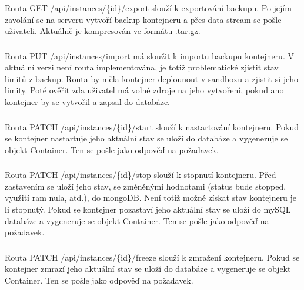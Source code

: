 \documentclass[a4paper,oneside,12pt]{report}
\begin{document}
Routa GET /api/instances/\{id\}/export slouží k exportování backupu.
Po jejím zavolání se na serveru vytvoří backup kontejneru a přes data stream se pošle uživateli.
Aktuálně je kompresován ve formátu .tar.gz.

\subsubsection{\color{apiyellow}{PUT -- /api/instances/import}}

Routa PUT /api/instances/import má sloužit k importu backupu kontejneru.
V aktuální verzi není routa implementována, je totiž problematické zjistit stav limitů z backup.
Routa by měla kontejner deplounout v sandboxu a zjistit si jeho limity.
Poté ověřit zda uživatel má volné zdroje na jeho vytvoření, pokud ano kontejner by se vytvořil a zapsal do databáze.


\subsubsection{}

Routa PATCH  /api/instances/\{id\}/start slouží k nastartování kontejneru.
Pokud se kontejner nastartuje jeho aktuální stav se uloží do databáze a vygeneruje se objekt Container.
Ten se pošle jako odpověď na požadavek.

\subsubsection{}

Routa PATCH  /api/instances/\{id\}/stop slouží k stopnutí kontejneru.
Před zastavením se uloží jeho stav, se změněnými hodnotami (status bude stopped, využití ram nula, atd.), do mongoDB.
Není totiž možné získat stav kontejneru je li stopnutý.
Pokud se kontejner pozastaví jeho aktuální stav se uloží do mySQL databáze a vygeneruje se objekt Container.
Ten se pošle jako odpověď na požadavek.


\subsubsection{}

Routa PATCH  /api/instances/\{id\}/freeze slouží k zmražení kontejneru.
Pokud se kontejner zmrazí jeho aktuální stav se uloží do databáze a vygeneruje se objekt Container.
Ten se pošle jako odpověď na požadavek.
\end{document}
